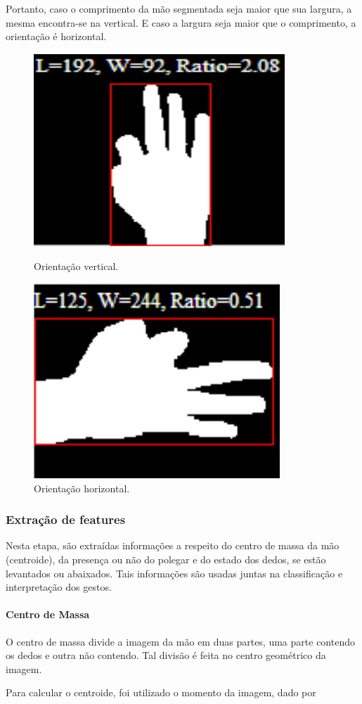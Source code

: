 \documentclass[conference]{IEEEtran}
\begin{document}
Portanto, caso o comprimento da mão segmentada seja maior que sua largura, a mesma encontra-se na vertical. E caso a largura seja maior que o comprimento, a orientação é horizontal.

\begin{figure}
\centering
  \centering
  \includegraphics[width=.6\linewidth]{figs/vertical.jpg}
  \caption{Orientação vertical.}
  \label{fig:sub1}
  \centering
  \includegraphics[width=.6\linewidth]{figs/horizontal.jpg}
  \caption{Orientação horizontal.}
  \label{fig:sub2}
\label{fig:test}
\end{figure}

\subsubsection{Extração de features}
\par Nesta etapa, são extraídas informações a respeito do centro de massa da mão (centroide), da presença ou não do polegar e do estado dos dedos, se estão levantados ou abaixados. Tais informações são usadas juntas na classificação e interpretação dos gestos.
\paragraph{Centro de Massa}
\par O centro de massa divide a imagem da mão em duas partes, uma parte contendo os dedos e outra não contendo. Tal divisão é feita no centro geométrico da imagem.
\par Para calcular o centroide, foi utilizado o momento da imagem, dado por 
\end{document}
